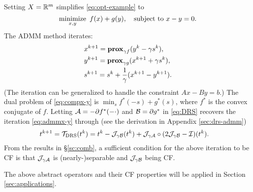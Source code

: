 {\DIFdelbegin %
\DIFdelend \DIFaddbegin \begin{example}\DIFaddend \label{alg:admm} Setting $X=\mathbb{R}^m$ simplifies \eqref{eq:opt-example} to 
\begin{equation}\label{eq:compx-y}
\Min_{x,y}~f(x)+g(y),\quad\St~ x-y=0.
\end{equation} 
The ADMM method iterates:
\begin{subequations}\label{eq:admmx-y}
\begin{align}
&x^{k+1}=\prox_{\gamma f}(y^k-\gamma s^k),\\%
&y^{k+1}=\prox_{\gamma g}(x^{k+1}+\gamma s^{k}),\\%
&s^{k+1}=s^k+\frac{1}{\gamma}(x^{k+1}-y^{k+1}).
\end{align}
\end{subequations}
(The iteration can be generalized to handle the constraint $Ax-By=b$.) The dual problem of \eqref{eq:compx-y} is $\min_s f^*(-s)+g^*(s)$, where $f^*$ is the convex conjugate of $f$. Letting ${\mathcal{A}}=-\partial f^*(-\cdot)$ and ${\mathcal{B}}=\partial g^*$ in \eqref{eq:DRS} recovers the iteration  \eqref{eq:admmx-y} through (see the derivation in Appendix \ref{sec:drs-admm})
\begin{align*}
&t^{k+1}=\TDRS(t^k)=t^k-\cJ_{\gamma \cB}(t^k)+\cJ_{\gamma\cA}\circ(2\cJ_{\gamma \cB}-\cI)(t^k).
\end{align*}  %
From the results in \S\ref{sc:comb}, a sufficient condition for the above iteration to be CF is that ${\mathcal{J}}_{\gamma{\mathcal{A}}}$ is (nearly-)separable and ${\mathcal{J}}_{\gamma{\mathcal{B}}}$ being CF. 
\end{example}

The above abstract operators and their CF properties will be applied in Section \ref{sec:applications}.


}
